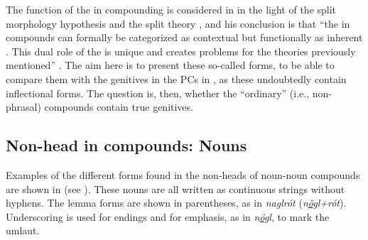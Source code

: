 \documentclass[output=paper]{LSP/langsci}
\begin{document}
The function of the  in compounding is considered in \citet{Indriðason1999,Indriðason2014} in the light of the split morphology hypothesis \citep{Perlmutter1988} and the split  theory \citep{Booij1994}, and his conclusion is that “the  in  compounds can formally be categorized as contextual  but functionally as inherent . This dual role of the  is unique and creates problems for the theories previously mentioned” \citep[30]{Indriðason2014}. The aim here is to present these so-called  forms, to be able to compare them with the genitives in the PCs in , as these undoubtedly contain inflectional forms. The question is, then, whether the “ordinary” (i.e., non-phrasal) compounds contain true genitives. 

\subsection{Non-head in compounds: Nouns}\label{sec:bjarnadottir:2.4}

Examples of the different forms found in the non-heads of noun-noun compounds are shown in  (see \citealt{Bjarnadóttir2002}). These nouns are all written as continuous strings without hyphens. The lemma forms are shown in parentheses, as in \textit{naglrót} (\textit{n\underline{ö}gl+rót}).  Underscoring is used for  endings and for emphasis, as in \textit{n\underline{ö}gl}, to mark the umlaut.


\end{document}
